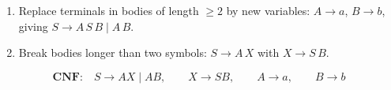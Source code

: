 \begin{enumerate}
\item Replace terminals in bodies of length $\ge 2$ by new variables: $A \to a$, $B \to b$, giving
$S \to A\,S\,B \mid A\,B$.
\item Break bodies longer than two symbols: $S \to A\,X$ with $X \to S\,B$.
\end{enumerate}
\[
\textbf{CNF:}\quad S \to AX \mid AB, \qquad X \to SB, \qquad A \to a, \qquad B \to b
\]
